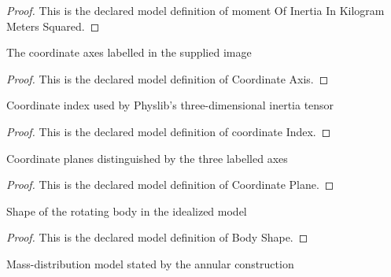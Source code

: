 \begin{proof}
  This is the declared model definition of moment Of Inertia In Kilogram Meters Squared.
\end{proof}
\begin{definition}
  \label{def:physics:phyx-mini-0700:phyxminiproblems-problemphyxmini0700-coordinateaxis}
  The coordinate axes labelled in the supplied image
\end{definition}
\begin{proof}
  This is the declared model definition of Coordinate Axis.
\end{proof}
\begin{definition}
  \label{def:physics:phyx-mini-0700:phyxminiproblems-problemphyxmini0700-coordinateindex}
  Coordinate index used by Physlib's three-dimensional inertia tensor
\end{definition}
\begin{proof}
  This is the declared model definition of coordinate Index.
\end{proof}
\begin{definition}
  \label{def:physics:phyx-mini-0700:phyxminiproblems-problemphyxmini0700-coordinateplane}
  Coordinate planes distinguished by the three labelled axes
\end{definition}
\begin{proof}
  This is the declared model definition of Coordinate Plane.
\end{proof}
\begin{definition}
  \label{def:physics:phyx-mini-0700:phyxminiproblems-problemphyxmini0700-bodyshape}
  Shape of the rotating body in the idealized model
\end{definition}
\begin{proof}
  This is the declared model definition of Body Shape.
\end{proof}
\begin{definition}
  \label{def:physics:phyx-mini-0700:phyxminiproblems-problemphyxmini0700-diskmassdistribution}
  Mass-distribution model stated by the annular construction
\end{definition}
